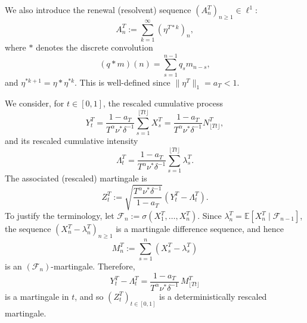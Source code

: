 \documentclass[letterpaper]{article}
\numberwithin{equation}{section}
\theoremstyle{definition}
\theoremstyle{remark}
\begin{document}
We also introduce the renewal (resolvent) sequence $(A_n^T)_{n\ge1}\in\ell^1$:
\begin{equation}\label{ATexpression}
  A_n^T:=\sum_{k=1}^\infty(\eta^{T*k})_n,
\end{equation}
where $*$ denotes the discrete convolution
\[
  (q*m)(n)=\sum_{s=1}^{n-1}q_sm_{n-s},
\]
and $\eta^{*k+1}=\eta*\eta^{*k}$. This is well-defined since $\|\eta^T\|_1=a_T<1$.

\medskip

We consider, for $t\in[0,1]$, the rescaled cumulative process
\begin{equation}\label{eq:expressionofy}
  Y_t^T=\frac{1-a_T}{T^\alpha \nu^*\delta^{-1}}\sum_{s=1}^{\lfloor Tt \rfloor}X_s^T
  =\frac{1-a_T}{T^\alpha \nu^*\delta^{-1}}N_{\lfloor Tt \rfloor}^T,
\end{equation}
and its rescaled cumulative intensity
\begin{equation}\label{eq:LambdaT_def}
  \Lambda_t^T=\frac{1-a_T}{T^\alpha \nu^*\delta^{-1}}\sum_{s=1}^{\lfloor Tt \rfloor}\lambda_s^T.
\end{equation}
The associated (rescaled) martingale is
\begin{equation}\label{eq:expressionofz}
  Z_t^T:=\sqrt{\frac{T^\alpha \nu^*\delta^{-1}}{1-a_T}}(Y_t^T-\Lambda_t^T).
\end{equation}
{
To justify the terminology, let $\mathcal F_n:=\sigma(X_1^T,\dots,X_n^T)$. Since
$\lambda_n^T=\mathbb E[X_n^T\mid\mathcal F_{n-1}]$, the sequence $(X_n^T-\lambda_n^T)_{n\ge1}$
is a martingale difference sequence, and hence
\[
M_n^T:=\sum_{s=1}^n (X_s^T-\lambda_s^T)
\]
is an $(\mathcal F_n)$-martingale. Therefore,
\[
  Y_t^T-\Lambda_t^T=\frac{1-a_T}{T^\alpha \nu^*\delta^{-1}}\,M_{\lfloor Tt\rfloor}^T
\]
is a martingale in $t$, and so $(Z_t^T)_{t\in[0,1]}$ is a deterministically rescaled martingale.}
\end{document}
